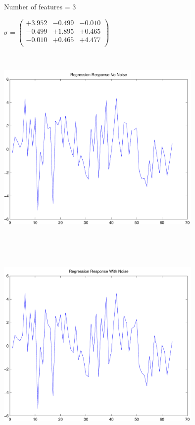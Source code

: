 \documentclass[9pt]{article}
\theoremstyle{plain}
\theoremstyle{definition}
\theoremstyle{remark}
\numberwithin{equation}{section}
\begin{document}
Number of features = 3

$\sigma = \left(
\begin{array}{
ccc}
+3.952 & -0.499 & -0.010 \\
-0.499 & +1.895 & +0.465 \\
-0.010 & +0.465 & +4.477 \\
\end{array}
\right)$ \newline 

\includegraphics[width=10.0cm,height=10.0cm]{regression_response_no_noise.pdf}

\includegraphics[width=10.0cm,height=10.0cm]{regression_response_with_noise.pdf}
\end{document}
